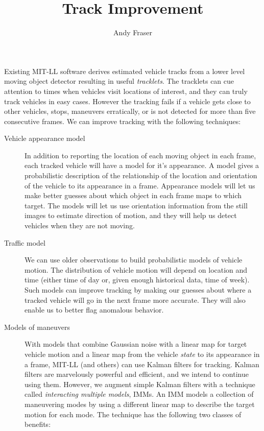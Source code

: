 \documentclass[]{article}
\title{Track Improvement}
\author{Andy Fraser}
\begin{document}
\maketitle

Existing MIT-LL software derives estimated vehicle tracks from a lower
level moving object detector resulting in useful \emph{tracklets}.
The tracklets can cue attention to times when vehicles visit locations
of interest, and they can truly track vehicles in easy cases.  However
the tracking fails if a vehicle gets close to other vehicles, stops,
maneuvers erratically, or is not detected for more than five
consecutive frames.  We can improve tracking with the following
techniques:
\begin{description}
\item[Vehicle appearance model] In addition to reporting the location
  of each moving object in each frame, each tracked vehicle will have
  a model for it's appearance.  A model gives a probabilistic
  description of the relationship of the location and orientation of
  the vehicle to its appearance in a frame.  Appearance models will
  let us make better guesses about which object in each frame maps to
  which target. The models will let us use orientation information
  from the still images to estimate direction of motion, and they will
  help us detect vehicles when they are not moving.
\item[Traffic model] We can use older observations to build
  probabilistic models of vehicle motion.  The distribution of vehicle
  motion will depend on location and time (either time of day or,
  given enough historical data, time of week).  Such models can
  improve tracking by making our guesses about where a tracked vehicle
  will go in the next frame more accurate.  They will also enable us
  to better flag anomalous behavior.
\item[Models of maneuvers] With models that combine Gaussian noise
  with a linear map for target vehicle motion and a linear map from
  the vehicle \emph{state} to its appearance in a frame, MIT-LL (and
  others) can use Kalman filters for tracking.  Kalman filters are
  marvelously powerful and efficient, and we intend to continue using
  them.  However, we augment simple Kalman filters with a technique
  called \emph{interacting multiple models}, IMMs.  An IMM models a
  collection of maneuvering modes by using a different linear map to
  describe the target motion for each mode.  The technique has the
  following two classes of benefits:
  \begin{description}

\end{description}
\end{description}
\end{document}
